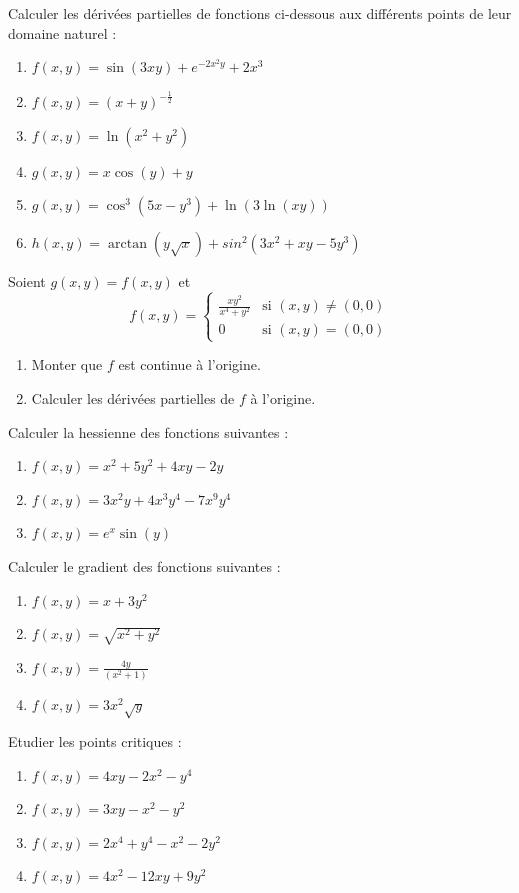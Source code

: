 \begin{exercise}
    Calculer les dérivées partielles de fonctions ci-dessous aux différents points de leur domaine naturel : 
    \begin{enumerate}[label=(\alph*)]
        \item $f(x,y) = \sin(3xy)+e^{-2x^2y}+2x^3$
        \item $f(x,y) = (x+y)^{-\frac{1}{2}}$
        \item $f(x,y) = \ln(x^2+y^2)$
        \item $g(x,y) = x\cos(y)+y$
        \item $g(x,y) = \cos^3(5x-y^3)+\ln(3\ln(xy))$
        \item $h(x,y) = \arctan(y\sqrt{x})+sin^2(3x^2+xy-5y^3)$
    \end{enumerate}
\end{exercise}

\begin{exercise}
    Soient $g(x,y) = f(x,y)$ et
    $$f(x,y) = \begin{cases}
        \displaystyle\frac{xy^2}{x^4+y^2} & \text{si }(x,y)\neq(0,0) \\
        0 & \text{si }(x,y)=(0,0) 
    \end{cases}$$
    \begin{enumerate}[label=(\alph*)]
        \item Monter que $f$ est continue à l'origine.
        \item Calculer les dérivées partielles de $f$ à l'origine.
    \end{enumerate}
\end{exercise}


\begin{exercise}
    Calculer la hessienne des fonctions suivantes :
    \begin{enumerate}[label=(\alph*)]
        \item $f(x,y)=x^2+5y^2+4xy-2y$
        \item $f(x,y) = 3x^2y+4x^3y^4-7x^9y^4$
        \item $f(x,y) =e^x\sin(y)$
    \end{enumerate}
\end{exercise}


\begin{exercise}
    Calculer le gradient des fonctions suivantes :
    \begin{enumerate}[label=(\alph*)]
        \item $f(x,y)  = x+3y^2$
        \item $f(x,y) = \sqrt{x^2+y^2 }$
        \item $f(x,y) = \displaystyle\frac{4y}{(x^2+1)}$
        \item $f(x,y) = 3x^2\sqrt{y}$
    \end{enumerate}
\end{exercise}

\begin{exercise}
    Etudier les points critiques :
    \begin{enumerate}[label=(\alph*)]
        \item $f(x,y) = 4xy-2x^2-y^4$
        \item $f(x,y) = 3xy - x^2 - y^2$
        \item $f(x,y) = 2x^4 + y^4 - x^2-2y^2$
        \item $f(x,y) = 4x^2-12xy+9y^2$
    \end{enumerate}
\end{exercise}